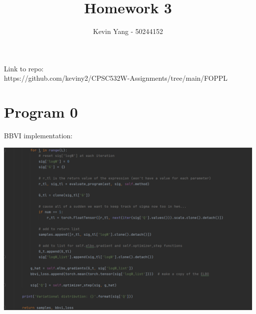 \documentclass[10pt]{homeworg}
\title{Homework 3}
\author{Kevin Yang - 50244152}
\begin{document}
\maketitle

\Huge{Link to repo:}\\
\Large{https://github.com/keviny2/CPSC532W-Assignments/tree/main/FOPPL}

\section{Program 0}
BBVI implementation:
\begin{center}
\includegraphics[scale=0.5]{figures/bbvi.png}
\end{center}

\newpage
\end{document}
